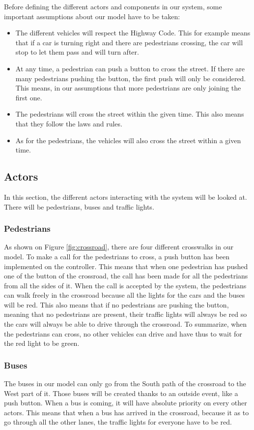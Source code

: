 Before defining the different actors and components in our system, some important assumptions about our model have to be taken:
\begin{itemize}
    \item The different vehicles will respect the Highway Code. This for example means that if a car is turning right and there are pedestrians crossing, the car will stop to let them pass and will turn after.
    \item At any time, a pedestrian can push a button to cross the street. If there are many pedestrians pushing the button, the first push will only be considered. This means, in our assumptions that more pedestrians are only joining the first one.
    \item The pedestrians will cross the street within the given time. This also means that they follow the laws and rules.
    \item As for the pedestrians, the vehicles will also cross the street within a given time.
\end{itemize}

\subsection{Actors}
In this section, the different actors interacting with the system will be looked at. There will be pedestrians, buses and traffic lights.

\subsubsection{Pedestrians}
As shown on Figure \ref{fig:crossroad}, there are four different crosswalks in our model.  To make a call for the pedestrians to cross, a push button has been implemented on the controller. This means that when one pedestrian has pushed one of the button of the crossroad, the call has been made for all the pedestrians from all the sides of it. When the call is accepted by the system, the pedestrians can walk freely in the crossroad because all the lights for the cars and the buses will be red. This also means that if no pedestrians are pushing the button, meaning that no pedestrians are present, their traffic lights will always be red so the cars will always be able to drive through the crossroad.
To summarize, when the pedestrians can cross, no other vehicles can drive and have thus to wait for the red light to be green. 

\subsubsection{Buses}
The buses in our model can only go from the South path of the crossroad to the West part of it. Those buses will be created thanks to an outside event, like a push button. When a bus is coming, it will have absolute priority on every other actors. This means that when a bus has arrived in the crossroad, because it as to go through all the other lanes, the traffic lights for everyone have to be red.

